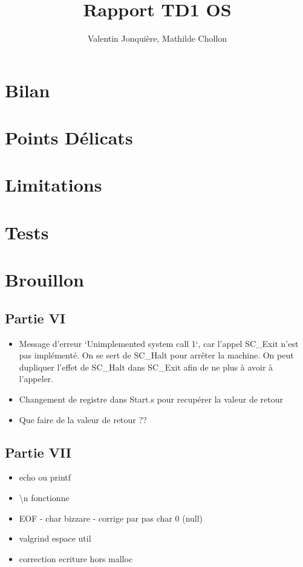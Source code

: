\documentclass{article}
\author{
    Valentin Jonquière,
    Mathilde Chollon
}
\title{Rapport TD1 OS}
\begin{document}
\maketitle

\pagebreak

\tableofcontents

\pagebreak

\section{Bilan}


\section{Points Délicats}


\section{Limitations}


\section{Tests}

\section{Brouillon}
\subsection{Partie VI}
\begin{itemize}
    \item Message d'erreur `Unimplemented system call 1`, car l'appel SC\_Exit n'est pas implémenté. On se sert de SC\_Halt pour arrêter la machine.
    On peut dupliquer l'effet de SC\_Halt dans SC\_Exit afin de ne plus à avoir à l'appeler.
    \item Changement de registre dans Start.s pour recupérer la valeur de retour
    \item Que faire de la valeur de retour ??
\end{itemize}

\subsection{Partie VII}
\begin{itemize}
    \item echo ou printf
    \item \textbackslash n fonctionne
    \item EOF - char bizzare - corrige par pas char 0 (null)
    \item valgrind espace util 
    \item correction ecriture hors malloc
\end{itemize}
\end{document}
